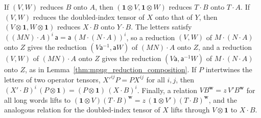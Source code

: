 \begin{lemma}
    \label{thm:mpug_action_tensor_reductions}
    \leanok
    If $(V,W)$ reduces $B$ onto $A$, then
    $(\mathbf 1\otimes V,\mathbf 1\otimes W)$ reduces $T\cdot B$ onto
    $T\cdot A$. If $(V,W)$ reduces the doubled-index tensor of $X$ onto that
    of $Y$, then $(V\otimes\mathbf 1,W\otimes\mathbf 1)$ reduces $X\cdot B$
    onto $Y\cdot B$. The letters satisfy
    $((MN)\cdot A)^i\,\mathsf a=\mathsf a\,(M\cdot(N\cdot A))^i$, so a
    reduction $(V,W)$ of $M\cdot(N\cdot A)$ onto $Z$ gives the reduction
    $(V\mathsf a^{-1},\mathsf aW)$ of $(MN)\cdot A$ onto $Z$, and a reduction
    $(V,W)$ of $(MN)\cdot A$ onto $Z$ gives the reduction
    $(V\mathsf a,\mathsf a^{-1}W)$ of $M\cdot(N\cdot A)$ onto $Z$, as in
    Lemma~\ref{thm:mpug_reduction_composition}. If $P$ intertwines the
    letters of two operator tensors, $X'^{ij}P=PX^{ij}$ for all $i,j$, then
    $(X'\cdot B)^i\,(P\otimes\mathbf 1)=(P\otimes\mathbf 1)\,(X\cdot B)^i$.
    Finally, a relation
    $VB^{\mathbf w}=z\,V'B^{\mathbf w}$ for all long words lifts to
    $(\mathbf 1\otimes V)(T\cdot B)^{\mathbf w}
        =z\,(\mathbf 1\otimes V')(T\cdot B)^{\mathbf w}$, and the analogous
    relation for the doubled-index tensor of $X$ lifts through
    $V\otimes\mathbf 1$ to $X\cdot B$.
\end{lemma}

